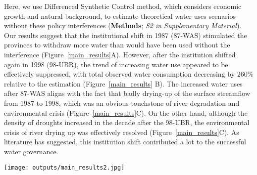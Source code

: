 Here, we use Differenced Synthetic Control method, which considers economic growth and natural background, to estimate theoretical water uses scenarios without these policy interferences (\textbf{Methods}; \textit{S2 in Supplementary Material}).
Our results suggest that the institutional shift in 1987 (87-WAS) stimulated the provinces to withdraw more water than would have been used without the interference (Figure~\ref{main_results}A).
However, after the institution shifted again in 1998 (98-UBR), the trend of increasing water use appeared to be effectively suppressed, with total observed water consumption decreasing by $260\%$ relative to the estimation (Figure~\ref{main_results} B).
The increased water uses after 87-WAS aligns with the fact that badly drying-up of the surface streamflow from 1987 to 1998, which was an obvious touchstone of river degradation and environmental crisis (Figure~\ref{main_results}C).
On the other hand, although the density of droughts increased in the decade after the 98-UBR, the environmental crisis of river drying up was effectively resolved (Figure~\ref{main_results}C).
As literature has suggested, this institution shift contributed a lot to the successful water governance.

\begin{figure*}[!h]
    \centering
    \texttt{[image: outputs/main\_results2.jpg]}
    \caption{
        Effects of two institutional shifts on water resources use and allocation in the Yellow River Basin (YRB).
        \textbf{A.} water uses of the YRB before and after the institutional shift in 1987 (87-WAS);
        \textbf{B.} water uses of the YRB before and after the institutional shift in 1998 (98-UBR). While the blue lines are statistic water use data, the grey ones are the estimation from the Differenced Synthetic Control method with economic and environmental background controlled.
        \textbf{C.} Drought intensity in the YRB and drying up events of the Yellow River. The size of the grey bubbles denotes the length of a drying upstream.
    }
    \label{main_results}
\end{figure*}

